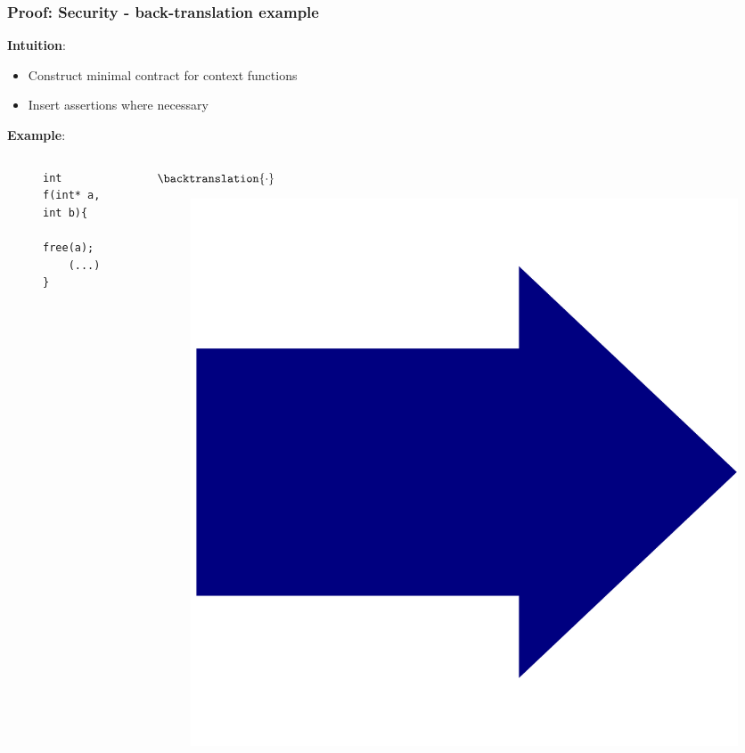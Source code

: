 \documentclass{beamer}
\begin{document}
\begin{frame}[fragile]
\frametitle{Proof: Security - back-translation example}
\textbf{Intuition}:\\
\begin{itemize}
\item Construct minimal contract for context functions\\
\item Insert assertions where necessary\\
\end{itemize}

\textbf{Example}:\\
\begin{columns}
\begin{column}{0.4\textwidth}

\begin{figure}[h]
  \centering
\begin{lstlisting}[style=CStyleNoNum, captionpos = t,title = Target]
int f(int* a, int b){
	free(a);
	(...)
}
\end{lstlisting}
\end{figure}
	
\end{column}

\begin{column}{0.08\textwidth}

	{\large$\backtranslation{\cdot}$}\\\vspace{-1em}
	\begin{figure}
	\includegraphics[width=0.8\linewidth]{BlueArrow}
	\end{figure}


\end{column}
\end{columns}
\end{frame}
\end{document}

